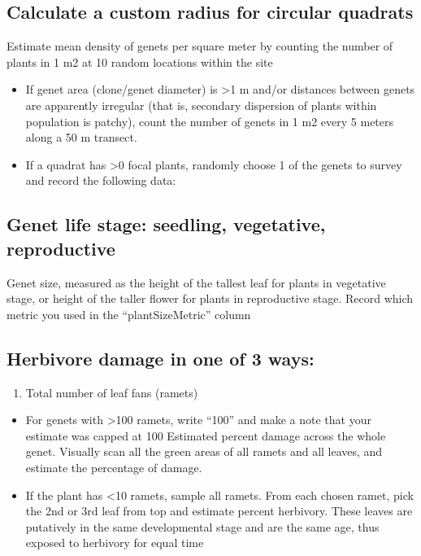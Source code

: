 \documentclass[
  letterpaper,
  DIV=11,
  numbers=noendperiod]{scrreprt}
\providecommand{\tightlist}{%
  \setlength{\itemsep}{0pt}\setlength{\parskip}{0pt}}\usepackage{longtable,booktabs,array}
\begin{document}
\subsection{Calculate a custom radius for circular
quadrats}\label{calculate-a-custom-radius-for-circular-quadrats}

Estimate mean density of genets per square meter by counting the number
of plants in 1 m2 at 10 random locations within the site

\begin{itemize}
\tightlist
\item
  If genet area (clone/genet diameter) is \textgreater1 m and/or
  distances between genets are apparently irregular (that is, secondary
  dispersion of plants within population is patchy), count the number of
  genets in 1 m2 every 5 meters along a 50 m transect.
\item
  If a quadrat has \textgreater0 focal plants, randomly choose 1 of the
  genets to survey and record the following data:
\end{itemize}

\subsection{Genet life stage: seedling, vegetative,
reproductive}\label{genet-life-stage-seedling-vegetative-reproductive}

Genet size, measured as the height of the tallest leaf for plants in
vegetative stage, or height of the taller flower for plants in
reproductive stage. Record which metric you used in the
``plantSizeMetric'' column

\subsection{Herbivore damage in one of 3
ways:}\label{herbivore-damage-in-one-of-3-ways}

\begin{enumerate}
\def\labelenumi{\arabic{enumi}.}
\tightlist
\item
  Total number of leaf fans (ramets)
\end{enumerate}

\begin{itemize}
\item
  For genets with \textgreater100 ramets, write ``100'' and make a note
  that your estimate was capped at 100 Estimated percent damage across
  the whole genet. Visually scan all the green areas of all ramets and
  all leaves, and estimate the percentage of damage.
\item
  If the plant has \textless10 ramets, sample all ramets. From each
  chosen ramet, pick the 2nd or 3rd leaf from top and estimate percent
  herbivory. These leaves are putatively in the same developmental stage
  and are the same age, thus exposed to herbivory for equal time
\end{itemize}
\end{document}

